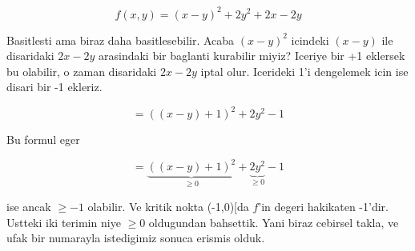\documentclass[12pt,fleqn]{article}
\begin{document}
\[ f(x,y) = (x-y)^2 + 2y^2 + 2x - 2y \]

Basitlesti ama biraz daha basitlesebilir. Acaba $(x-y)^2$ icindeki $(x-y)$
ile disaridaki $2x - 2y$ arasindaki bir baglanti kurabilir miyiz? Iceriye
bir +1 eklersek bu olabilir, o zaman disaridaki $2x - 2y$ iptal
olur. Icerideki 1'i dengelemek icin ise disari bir -1 ekleriz.

\[  = ((x-y) + 1)^2 + 2y^2 - 1\]

Bu formul eger 

\[  = \underbrace{((x-y) + 1)^2}_{\ge 0} + \underbrace{2y^2}_{\ge 0} - 1\]

ise ancak $\ge -1$ olabilir. Ve kritik nokta (-1,0)[da $f$'in degeri
hakikaten -1'dir. Ustteki iki terimin niye $\ge 0$ oldugundan bahsettik.
Yani biraz cebirsel takla, ve ufak bir numarayla istedigimiz sonuca erismis
olduk.
\end{document}
